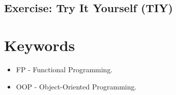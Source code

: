 \documentclass[10pt]{article}
\begin{document}
    \subsection{Exercise: Try It Yourself (TIY)}

\section{Keywords}
\label{sec:keywords}
    \begin{itemize}
      \item FP - Functional Programming.
      \item OOP - Object-Oriented Programming.
    \end{itemize}

\clearpage
\nocite{*}
\small{
}
\end{document}
